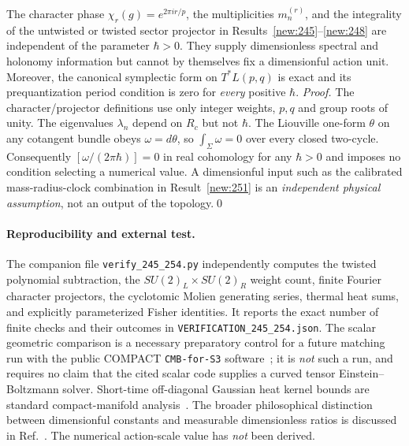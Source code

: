 \begin{result}\label{new:254}
The character phase $\chi_r(g)=e^{2\pi ir/p}$, the multiplicities $m_n^{(r)}$, and the integrality of the untwisted or twisted sector projector in Results~\ref{new:245}--\ref{new:248} are independent of the parameter $\hbar>0$. They supply dimensionless spectral and holonomy information but cannot by themselves fix a dimensionful action unit. Moreover, the canonical symplectic form on $T^*L(p,q)$ is exact and its prequantization period condition is zero for \emph{every} positive $\hbar$.
\textit{Proof.} The character/projector definitions use only integer weights, $p,q$ and group roots of unity. The eigenvalues $\lambda_n$ depend on $R_c$ but not $\hbar$. The Liouville one-form $\theta$ on any cotangent bundle obeys $\omega=d\theta$, so $\int_\Sigma\omega=0$ over every closed two-cycle. Consequently $[\omega/(2\pi\hbar)]=0$ in real cohomology for any $\hbar>0$ and imposes no condition selecting a numerical value. A dimensionful input such as the calibrated mass-radius-clock combination in Result~\ref{new:251} is an \emph{independent physical assumption}, not an output of the topology.\qed
\end{result}

\paragraph{Reproducibility and external test.} The companion file \texttt{verify\_245\_254.py} independently computes the twisted polynomial subtraction, the $SU(2)_L\times SU(2)_R$ weight count, finite Fourier character projectors, the cyclotomic Molien generating series, thermal heat sums, and explicitly parameterized Fisher identities. It reports the exact number of finite checks and their outcomes in \texttt{VERIFICATION\_245\_254.json}. The scalar geometric comparison is a necessary preparatory control for a future matching run with the public COMPACT \texttt{CMB-for-S3} software~\cite{COMPACT2026Modes,COMPACTCode}; it is \emph{not} such a run, and requires no claim that the cited scalar code supplies a curved tensor Einstein--Boltzmann solver. Short-time off-diagonal Gaussian heat kernel bounds are standard compact-manifold analysis~\cite{GrigoryanHeat}. The broader philosophical distinction between dimensionful constants and measurable dimensionless ratios is discussed in Ref.~\cite{DuffOkunVeneziano}. The numerical action-scale value has \emph{not} been derived.

